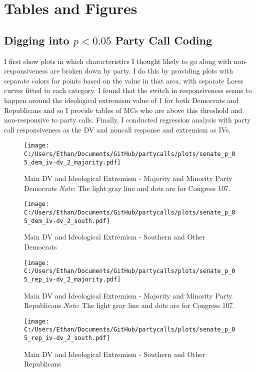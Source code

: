 \documentclass[12pt]{article}
\begin{document}
\section{Tables and Figures}

\subsection{Digging into $ p < 0.05 $ Party Call Coding}

I first show plots in which characteristics I thought likely to go along with non-responsiveness are broken down by party. I do this by providing plots with separate colors for points based on the value in that area, with separate Loess curves fitted to each category. I found that the switch in responsiveness seems to happen around the ideological extremism value of 1 for both Democrats and Republicans and so I provide tables of MCs who are above this threshold and non-responsive to party calls. Finally, I conducted regression analysis with party call responsiveness as the DV and noncall response and extremism as IVs.

\begin{figure}[h]
	\caption{Main DV and Ideological Extremism - Majority and Minority Party Democrats \textit{Note}: The light gray line and dots are for Congress 107.}
	\texttt{[image: C:/Users/Ethan/Documents/GitHub/partycalls/plots/senate\_p\_05\_dem\_iv-dv\_2\_majority.pdf]}
\end{figure}

\begin{figure}[h]
	\caption{Main DV and Ideological Extremism - Southern and Other Democrats}
	\texttt{[image: C:/Users/Ethan/Documents/GitHub/partycalls/plots/senate\_p\_05\_dem\_iv-dv\_2\_south.pdf]}
\end{figure}

\begin{figure}[h]
	\caption{Main DV and Ideological Extremism - Majority and Minority Party Republicans \textit{Note}: The light gray line and dots are for Congress 107.}
	\texttt{[image: C:/Users/Ethan/Documents/GitHub/partycalls/plots/senate\_p\_05\_rep\_iv-dv\_2\_majority.pdf]}
\end{figure}

\begin{figure}[h]
	\caption{Main DV and Ideological Extremism - Southern and Other Republicans}
	\texttt{[image: C:/Users/Ethan/Documents/GitHub/partycalls/plots/senate\_p\_05\_rep\_iv-dv\_2\_south.pdf]}
\end{figure}
\end{document}
